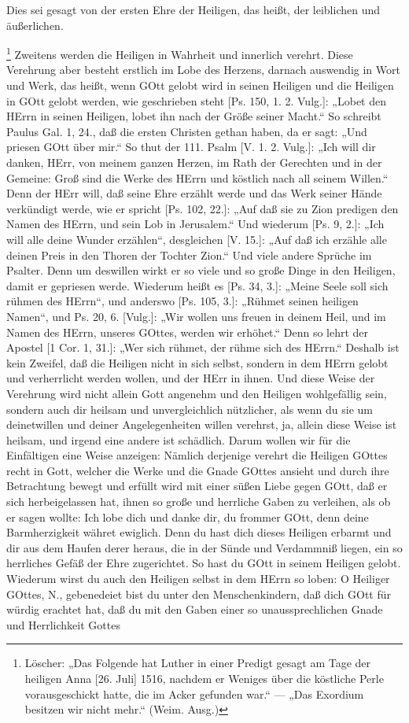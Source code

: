 Dies sei gesagt von der ersten Ehre der Heiligen, das heißt, der leiblichen und äußerlichen.

\footnote{Löscher: „Das Folgende hat Luther in einer Predigt gesagt am Tage der heiligen Anna [26. Juli] 1516, nachdem er Weniges über die köstliche Perle vorausgeschickt hatte, die im Acker gefunden war.“ — „Das Exordium besitzen wir nicht mehr.“ (Weim. Ausg.)} Zweitens werden die Heiligen in Wahrheit und innerlich verehrt. Diese Verehrung aber besteht erstlich im Lobe des Herzens, darnach auswendig in Wort und Werk, das heißt, wenn GOtt gelobt wird in seinen Heiligen und die Heiligen in GOtt gelobt werden, wie geschrieben steht [Ps. 150, 1. 2. Vulg.]: „Lobet den HErrn in seinen Heiligen, lobet ihn nach der Größe seiner Macht.“ So schreibt Paulus Gal. 1, 24., daß die ersten Christen gethan haben, da er sagt: „Und priesen GOtt über mir.“ So thut der 111. Psalm [V. 1. 2. Vulg.]: „Ich will dir danken, HErr, von meinem ganzen Herzen, im Rath der Gerechten und in der Gemeine: Groß sind die Werke des HErrn und köstlich nach all seinem Willen.“ Denn der HErr will, daß seine Ehre erzählt werde und das Werk seiner Hände verkündigt werde, wie er spricht [Ps. 102, 22.]: „Auf daß sie zu Zion predigen den Namen des HErrn, und sein Lob in Jerusalem.“ Und wiederum [Ps. 9, 2.]: „Ich will alle deine Wunder erzählen“, desgleichen [V. 15.]: „Auf daß ich erzähle alle deinen Preis in den Thoren der Tochter Zion.“ Und viele andere Sprüche im Psalter. Denn um deswillen wirkt er so viele und so große Dinge in den Heiligen, damit er gepriesen werde. Wiederum heißt es [Ps. 34, 3.]: „Meine Seele soll sich rühmen des HErrn“, und anderswo [Ps. 105, 3.]: „Rühmet seinen heiligen Namen“, und Ps. 20, 6. [Vulg.]: „Wir wollen uns freuen in deinem Heil, und im Namen des HErrn, unseres GOttes, werden wir erhöhet.“ Denn so lehrt der Apostel [1 Cor. 1, 31.]: „Wer sich rühmet, der rühme sich des HErrn.“ Deshalb ist kein Zweifel, daß die Heiligen nicht in sich selbst, sondern in dem HErrn gelobt und verherrlicht werden wollen, und der HErr in ihnen. Und diese Weise der Verehrung wird nicht allein Gott angenehm und den Heiligen wohlgefällig sein, sondern auch dir heilsam und unvergleichlich nützlicher, als wenn du sie um deinetwillen und deiner Angelegenheiten willen verehrst, ja, allein diese Weise ist heilsam, und irgend eine andere ist schädlich. Darum wollen wir für die Einfältigen eine Weise anzeigen: Nämlich derjenige verehrt die Heiligen GOttes recht in Gott, welcher die Werke und die Gnade GOttes ansieht und durch ihre Betrachtung bewegt und erfüllt wird mit einer süßen Liebe gegen GOtt, daß er sich herbeigelassen hat, ihnen so große und herrliche Gaben zu verleihen, als ob er sagen wollte: Ich lobe dich und danke dir, du frommer GOtt, denn deine Barmherzigkeit währet ewiglich. Denn du hast dich dieses Heiligen erbarmt und dir aus dem Haufen derer heraus, die in der Sünde und Verdammniß liegen, ein so herrliches Gefäß der Ehre zugerichtet. So hast du GOtt in seinem Heiligen gelobt. Wiederum wirst du auch den Heiligen selbst in dem HErrn so loben: O Heiliger GOttes, N., gebenedeiet bist du unter den Menschenkindern, daß dich GOtt für würdig erachtet hat, daß du mit den Gaben einer so unaussprechlichen Gnade und Herrlichkeit Gottes 